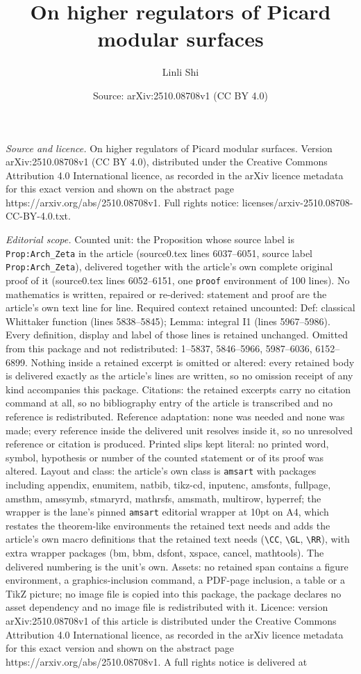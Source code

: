 \documentclass[10pt,a4paper]{amsart}
\title[On higher regulators of Picard modular surfaces]{On higher regulators of Picard modular surfaces}
\author{Linli Shi}
\date{Source: arXiv:2510.08708v1 (CC BY 4.0)}
\begin{document}
\maketitle

\noindent\emph{Source and licence.} On higher regulators of Picard modular surfaces. Version arXiv:2510.08708v1 (CC BY 4.0), distributed under the Creative Commons Attribution 4.0 International licence, as recorded in the arXiv licence metadata for this exact version and shown on the abstract page https://arxiv.org/abs/2510.08708v1. Full rights notice: licenses/arxiv-2510.08708-CC-BY-4.0.txt.\par\smallskip

\noindent\textit{Editorial scope.} Counted unit: the Proposition whose source label is \texttt{Prop:Arch\_Zeta} in the article (source0.tex lines 6037--6051, source label \texttt{Prop:Arch\_Zeta}), delivered together with the article's own complete original proof of it (source0.tex lines 6052--6151, one \texttt{proof} environment of 100 lines). No mathematics is written, repaired or re-derived: statement and proof are the article's own text line for line. Required context retained uncounted: Def: classical Whittaker function (lines 5838--5845); Lemma: integral I1 (lines 5967--5986). Every definition, display and label of those lines is retained unchanged. Omitted from this package and not redistributed: 1--5837, 5846--5966, 5987--6036, 6152--6899. Nothing inside a retained excerpt is omitted or altered: every retained body is delivered exactly as the article's lines are written, so no omission receipt of any kind accompanies this package. Citations: the retained excerpts carry no citation command at all, so no bibliography entry of the article is transcribed and no reference is redistributed. Reference adaptation: none was needed and none was made; every reference inside the delivered unit resolves inside it, so no unresolved reference or citation is produced. Printed slips kept literal: no printed word, symbol, hypothesis or number of the counted statement or of its proof was altered. Layout and class: the article's own class is \texttt{amsart} with packages including appendix, enumitem, natbib, tikz-cd, inputenc, amsfonts, fullpage, amsthm, amssymb, stmaryrd, mathrsfs, amsmath, multirow, hyperref; the wrapper is the lane's pinned \texttt{amsart} editorial wrapper at 10pt on A4, which restates the theorem-like environments the retained text needs and adds the article's own macro definitions that the retained text needs (\texttt{\textbackslash CC}, \texttt{\textbackslash GL}, \texttt{\textbackslash RR}), with extra wrapper packages (bm, bbm, dsfont, xspace, cancel, mathtools). The delivered numbering is the unit's own. Assets: no retained span contains a figure environment, a graphics-inclusion command, a PDF-page inclusion, a table or a TikZ picture; no image file is copied into this package, the package declares no asset dependency and no image file is redistributed with it. Licence: version arXiv:2510.08708v1 of this article is distributed under the Creative Commons Attribution 4.0 International licence, as recorded in the arXiv licence metadata for this exact version and shown on the abstract page https://arxiv.org/abs/2510.08708v1. A full rights notice is delivered at 
\end{document}
